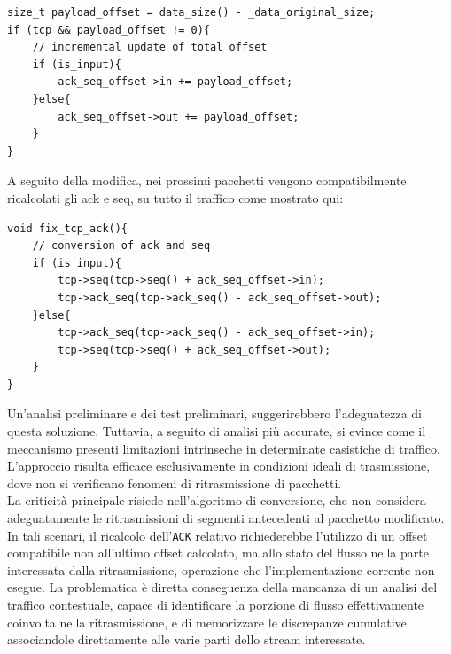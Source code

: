 \begin{listing}[H]
    \begin{verbatim}
size_t payload_offset = data_size() - _data_original_size;
if (tcp && payload_offset != 0){
    // incremental update of total offset
    if (is_input){
        ack_seq_offset->in += payload_offset;
    }else{
        ack_seq_offset->out += payload_offset;
    }
}
\end{verbatim}
\end{listing}
A seguito della modifica, nei prossimi pacchetti vengono compatibilmente ricalcolati gli ack e seq, su tutto il traffico come mostrato qui:
\begin{listing}[H]
    \begin{verbatim}
void fix_tcp_ack(){
    // conversion of ack and seq
    if (is_input){
        tcp->seq(tcp->seq() + ack_seq_offset->in);
        tcp->ack_seq(tcp->ack_seq() - ack_seq_offset->out);
    }else{
        tcp->ack_seq(tcp->ack_seq() - ack_seq_offset->in);
        tcp->seq(tcp->seq() + ack_seq_offset->out);
    }
}
\end{verbatim}
\end{listing}
Un'analisi preliminare e dei test preliminari, suggerirebbero l'adeguatezza di questa soluzione. Tuttavia, a seguito di analisi più accurate, si evince come il meccanismo presenti limitazioni intrinseche in determinate casistiche di traffico. L'approccio risulta efficace esclusivamente in condizioni ideali di trasmissione, dove non si verificano fenomeni di ritrasmissione di pacchetti.\\
La criticità principale risiede nell'algoritmo di conversione, che non considera adeguatamente le ritrasmissioni di segmenti antecedenti al pacchetto modificato. In tali scenari, il ricalcolo dell'\texttt{ACK} relativo richiederebbe l'utilizzo di un offset compatibile non all'ultimo offset calcolato, ma allo stato del flusso nella parte interessata dalla ritrasmissione, operazione che l'implementazione corrente non esegue. La problematica è diretta conseguenza della mancanza di un analisi del traffico contestuale, capace di identificare la porzione di flusso effettivamente coinvolta nella ritrasmissione, e di memorizzare le discrepanze cumulative associandole direttamente alle varie parti dello stream interessate.
